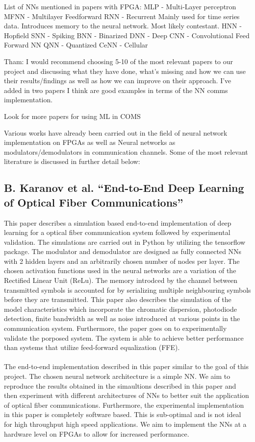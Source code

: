 List of NNs mentioned in papers with FPGA:
MLP - Multi-Layer perceptron 
MFNN - Multilayer Feedforward
RNN - Recurrent 
    Mainly used for time series data. Introduces memory to the neural network. Most likely contestant.
HNN - Hopfield
SNN - Spiking
BNN - Binarized
DNN - Deep
CNN - Convolutional
Feed Forward NN
QNN - Quantized
CeNN - Cellular

Tham: I would recommend choosing 5-10 of the most relevant papers to our project and discussing what they have done, what's missing and how we can use their results/findings as well as how we can improve on their approach. I've added in two papers I think are good examples in terms of the NN comms implementation.

Look for more papers for using ML in COMS

\fi

Various works have already been carried out in the field of neural network implementation on FPGAs as well as Neural networks as modulators/demodulators in communication channels. Some of the most relevant literature is discussed in further detail below:

\subsection{B. Karanov et al. “End-to-End Deep Learning of Optical Fiber Communications” \autocite{8433895}}

This paper describes a simulation based end-to-end implementation of deep learning for a optical fiber communication system followed by experimental validation. The simulations are carried out in Python by utilizing the tensorflow package. The modulator and demodulator are designed as fully connected NNs with 2 hidden layers and an arbitrarily chosen number of nodes per layer. The chosen activation functions used in the neural networks are a variation of the Rectified Linear Unit (ReLu). The memory introdced by the channel between transmitted symbols is accounted for by serializing multiple neighbouring symbols before they are transmitted. This paper also describes the simulation of the model characteristics which incorporate the chromatic dispersion, photodiode detection, finite bandwidth as well as noise introduced at various points in the communication system. Furthermore, the paper goes on to experimentally validate the porposed system. The system is able to achieve better performance than systems that utilize feed-forward equalization (FFE).
\\
\\
The end-to-end implementation described in this paper similar to the goal of this project. The chosen neural network architecture is a simple NN. We aim to reproduce the results obtained in the simaultions described in this paper and then experiment with different architectures of NNs to better suit the application of optical fiber communications. Furthermore, the experimental implementation in this paper is completely software based. This is sub-optimal and is not ideal for high throughput high speed applications. We aim to implement the NNs at a hardware level on FPGAs to allow for increased performance. 

